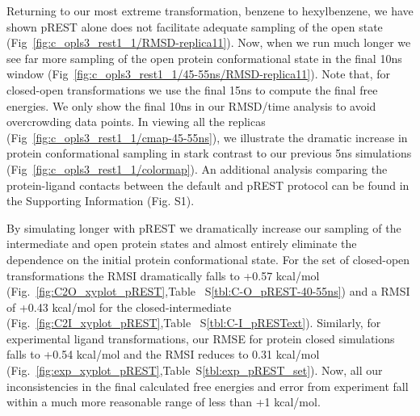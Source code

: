 Returning to our most extreme transformation, benzene to hexylbenzene, we have shown pREST alone does not facilitate adequate sampling of the open state (Fig~\ref{fig:c_opls3_rest1_1/RMSD-replica11}).
Now, when we run much longer we see far more sampling of the open protein conformational state in the final 10ns window (Fig~\ref{fig:c_opls3_rest1_1/45-55ns/RMSD-replica11}).
Note that, for closed-open transformations we use the final 15ns to compute the final free energies.
We only show the final 10ns in our RMSD/time analysis to avoid overcrowding data points.
In viewing all the replicas (Fig~\ref{fig:c_opls3_rest1_1/cmap-45-55ns}), we illustrate the dramatic increase in protein conformational sampling in stark contrast to our previous 5ns simulations (Fig~\ref{fig:c_opls3_rest1_1/colormap}).
An additional analysis comparing the protein-ligand contacts between the default and pREST protocol can be found in the Supporting Information (Fig. S1).

By simulating longer with pREST we dramatically increase our sampling of the intermediate and open protein states and almost entirely eliminate the dependence on the initial protein conformational state.
For the set of closed-open transformations the RMSI dramatically falls to +0.57 kcal/mol (Fig.~\ref{fig:C2O_xyplot_pREST},Table ~S\ref{tbl:C-O_pREST-40-55ns}) and a RMSI of +0.43 kcal/mol for the closed-intermediate (Fig.~\ref{fig:C2I_xyplot_pREST},Table ~S\ref{tbl:C-I_pRESText}).
Similarly, for experimental ligand transformations, our RMSE for protein closed simulations falls to +0.54 kcal/mol and the RMSI reduces to 0.31 kcal/mol (Fig.~\ref{fig:exp_xyplot_pREST},Table~S\ref{tbl:exp_pREST_set}).
Now, all our inconsistencies in the final calculated free energies and error from experiment fall within a much more reasonable range of less than +1 kcal/mol.

